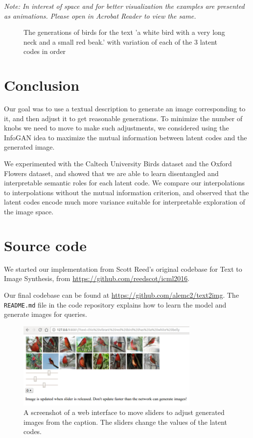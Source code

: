 \documentclass{article}
\begin{document}
\textit{Note: In interest of space and for better visualization the examples are
presented as animations. Please open in Acrobat Reader to view the same.}
\begin{figure}
\caption{The generations of birds for the text 'a white bird with a very long
neck and a small red beak.' with variation of each of the 3 latent codes in
order}
\label{animation}
\end{figure}
\section{Conclusion}

Our goal was to use a textual description to generate an image corresponding to it, and then adjust it to get reasonable generations. To minimize the number of knobs we need to move to make such adjustments, we considered using the InfoGAN idea to maximize the mutual information between latent codes and the generated image.

We experimented with the Caltech University Birds dataset and the Oxford Flowers dataset, and showed that we are able to learn disentangled and interpretable semantic roles for each latent code. We compare our interpolations to interpolations without the mutual information criterion, and observed that the latent codes encode much more variance suitable for interpretable exploration of the image space.



\section*{Source code}

We started our implementation from Scott Reed's original codebase for Text to Image Synthesis, from \url{https://github.com/reedscot/icml2016}.

Our final codebase can be found at \url{https://github.com/alemc2/text2img}. The \texttt{README.md} file in the code repository explains how to learn the model and generate images for queries.

\begin{figure}
    \centering
    \includegraphics[width=0.8\textwidth]{web}
    \caption{A screenshot of a web interface to move sliders to adjust generated images from the caption. The sliders change the values of the latent codes.}
    \label{fig:web}
\end{figure}
\end{document}
